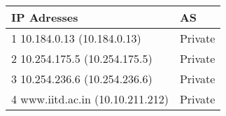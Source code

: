 \documentclass{article}
\begin{document}
\begin{table}[!ht]
    \centering
\begin{tabular}{|l|l|}
\hline
\textbf{IP Adresses}                                                        & \textbf{AS}                                                           \\ \hline
1  10.184.0.13 (10.184.0.13)                                                & Private                                                               \\ \hline
2  10.254.175.5 (10.254.175.5)                                              & Private                                                               \\ \hline
3  10.254.236.6 (10.254.236.6)                                              & Private                                                               \\ \hline
4  www.iitd.ac.in (10.10.211.212)                                           & Private\\ \hline
\end{tabular}
\end{table}
\end{document}
